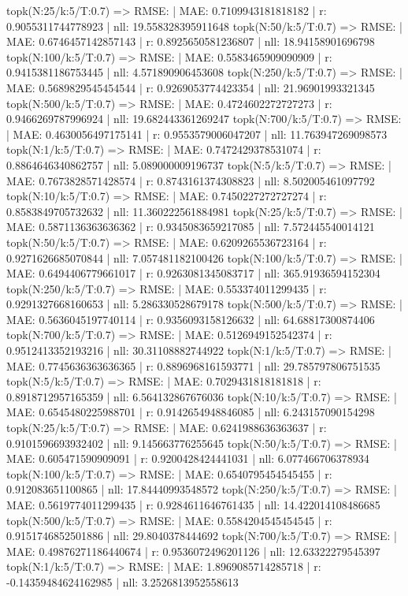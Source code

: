 topk(N:25/k:5/T:0.7) => RMSE: | MAE: 0.7109943181818182 | r: 0.9055311744778923 | nll: 19.558328395911648
topk(N:50/k:5/T:0.7) => RMSE: | MAE: 0.6746457142857143 | r: 0.8925650581236807 | nll: 18.94158901696798
topk(N:100/k:5/T:0.7) => RMSE: | MAE: 0.5583465909090909 | r: 0.9415381186753445 | nll: 4.571890906453608
topk(N:250/k:5/T:0.7) => RMSE: | MAE: 0.5689829545454544 | r: 0.9269053774423354 | nll: 21.96901993321345
topk(N:500/k:5/T:0.7) => RMSE: | MAE: 0.4724602272727273 | r: 0.9466269787996924 | nll: 19.682443361269247
topk(N:700/k:5/T:0.7) => RMSE: | MAE: 0.4630056497175141 | r: 0.9553579006047207 | nll: 11.763947269098573
topk(N:1/k:5/T:0.7) => RMSE: | MAE: 0.7472429378531074 | r: 0.8864646340862757 | nll: 5.089000009196737
topk(N:5/k:5/T:0.7) => RMSE: | MAE: 0.7673828571428574 | r: 0.8743161374308823 | nll: 8.502005461097792
topk(N:10/k:5/T:0.7) => RMSE: | MAE: 0.7450227272727274 | r: 0.8583849705732632 | nll: 11.360222561884981
topk(N:25/k:5/T:0.7) => RMSE: | MAE: 0.5871136363636362 | r: 0.9345083659217085 | nll: 7.572445540014121
topk(N:50/k:5/T:0.7) => RMSE: | MAE: 0.6209265536723164 | r: 0.9271626685070844 | nll: 7.057481182100426
topk(N:100/k:5/T:0.7) => RMSE: | MAE: 0.6494406779661017 | r: 0.9263081345083717 | nll: 365.91936594152304
topk(N:250/k:5/T:0.7) => RMSE: | MAE: 0.553374011299435 | r: 0.9291327668160653 | nll: 5.286330528679178
topk(N:500/k:5/T:0.7) => RMSE: | MAE: 0.5636045197740114 | r: 0.9356093158126632 | nll: 64.68817300874406
topk(N:700/k:5/T:0.7) => RMSE: | MAE: 0.5126949152542374 | r: 0.9512413352193216 | nll: 30.31108882744922
topk(N:1/k:5/T:0.7) => RMSE: | MAE: 0.7745636363636365 | r: 0.8896968161593771 | nll: 29.785797806751535
topk(N:5/k:5/T:0.7) => RMSE: | MAE: 0.7029431818181818 | r: 0.8918712957165359 | nll: 6.564132867676036
topk(N:10/k:5/T:0.7) => RMSE: | MAE: 0.6545480225988701 | r: 0.9142654948846085 | nll: 6.243157090154298
topk(N:25/k:5/T:0.7) => RMSE: | MAE: 0.6241988636363637 | r: 0.9101596693932402 | nll: 9.145663776255645
topk(N:50/k:5/T:0.7) => RMSE: | MAE: 0.605471590909091 | r: 0.9200428424441031 | nll: 6.077466706378934
topk(N:100/k:5/T:0.7) => RMSE: | MAE: 0.6540795454545455 | r: 0.912083651100865 | nll: 17.84440993548572
topk(N:250/k:5/T:0.7) => RMSE: | MAE: 0.5619774011299435 | r: 0.9284611646761435 | nll: 14.422014108486685
topk(N:500/k:5/T:0.7) => RMSE: | MAE: 0.5584204545454545 | r: 0.9151746852501886 | nll: 29.8040378444692
topk(N:700/k:5/T:0.7) => RMSE: | MAE: 0.49876271186440674 | r: 0.9536072496201126 | nll: 12.63322279545397
topk(N:1/k:5/T:0.7) => RMSE: | MAE: 1.8969085714285718 | r: -0.14359484624162985 | nll: 3.2526813952558613
